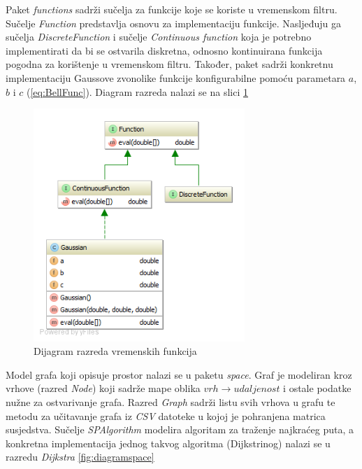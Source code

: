 \documentclass[times, utf8, diplomski, numeric]{fer}
\begin{document}
Paket \emph{functions} sadrži sučelja za funkcije koje se koriste u vremenskom
filtru. Sučelje \emph{Function} predstavlja osnovu za implementaciju funkcije.
Nasljeđuju ga sučelja \emph{DiscreteFunction} i sučelje \emph{Continuous
function} koja je potrebno implementirati da bi se ostvarila diskretna, odnosno
kontinuirana funkcija pogodna za korištenje u vremenskom filtru. Također, paket
sadrži konkretnu implementaciju Gaussove zvonolike funkcije konfigurabilne
pomoću parametara $a$, $b$ i $c$ (\ref{eq:BellFunc}). Diagram razreda nalazi se
na slici \ref{fig:diagramfunc}

\begin{figure}[H]
	\centering
	\includegraphics[width=8cm]{images/diagrams/diagramfunc.png}
	\caption{Dijagram razreda vremenskih funkcija}
	\label{fig:diagramfunc}
\end{figure}

Model grafa koji opisuje prostor nalazi se u paketu \emph{space}. Graf je
modeliran kroz vrhove (razred \emph{Node}) koji sadrže mape oblika
$vrh \rightarrow udaljenost$ i ostale podatke nužne za ostvarivanje grafa.
Razred \emph{Graph} sadrži listu svih vrhova u grafu te metodu za učitavanje
grafa iz \emph{CSV} datoteke u kojoj je pohranjena matrica susjedstva. Sučelje
\emph{SPAlgorithm} modelira algoritam za traženje najkraćeg puta, a konkretna
implementacija jednog takvog algoritma (Dijkstrinog) nalazi se u razredu
\emph{Dijkstra} \ref{fig:diagramspace}
\end{document}
